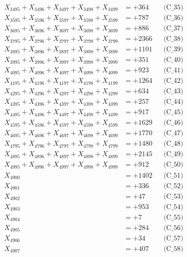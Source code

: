 \documentclass[a4paper,10pt]{article}
\begin{document}
{\begin{align}
X_{3495} + X_{3496} + X_{3497} + X_{3498} + X_{3499} &= +364 && \text{(C\_35)} \\
\allowbreak
X_{3595} + X_{3596} + X_{3597} + X_{3598} + X_{3599} &= +787 && \text{(C\_36)} \\
X_{3695} + X_{3696} + X_{3697} + X_{3698} + X_{3699} &= +886 && \text{(C\_37)} \\
X_{3795} + X_{3796} + X_{3797} + X_{3798} + X_{3799} &= +2366 && \text{(C\_38)} \\
X_{3895} + X_{3896} + X_{3897} + X_{3898} + X_{3899} &= +1101 && \text{(C\_39)} \\
X_{3995} + X_{3996} + X_{3997} + X_{3998} + X_{3999} &= +351 && \text{(C\_40)} \\
\allowbreak
X_{4095} + X_{4096} + X_{4097} + X_{4098} + X_{4099} &= +923 && \text{(C\_41)} \\
X_{4195} + X_{4196} + X_{4197} + X_{4198} + X_{4199} &= +1264 && \text{(C\_42)} \\
X_{4295} + X_{4296} + X_{4297} + X_{4298} + X_{4299} &= +634 && \text{(C\_43)} \\
X_{4395} + X_{4396} + X_{4397} + X_{4398} + X_{4399} &= +257 && \text{(C\_44)} \\
X_{4495} + X_{4496} + X_{4497} + X_{4498} + X_{4499} &= +917 && \text{(C\_45)} \\
\allowbreak
X_{4595} + X_{4596} + X_{4597} + X_{4598} + X_{4599} &= +1629 && \text{(C\_46)} \\
X_{4695} + X_{4696} + X_{4697} + X_{4698} + X_{4699} &= +1770 && \text{(C\_47)} \\
X_{4795} + X_{4796} + X_{4797} + X_{4798} + X_{4799} &= +1480 && \text{(C\_48)} \\
X_{4895} + X_{4896} + X_{4897} + X_{4898} + X_{4899} &= +2145 && \text{(C\_49)} \\
X_{4995} + X_{4996} + X_{4997} + X_{4998} + X_{4999} &= +912 && \text{(C\_50)} \\
\allowbreak
X_{4900} &= +1402 && \text{(C\_51)} \\
X_{4901} &= +336 && \text{(C\_52)} \\
X_{4902} &= +47 && \text{(C\_53)} \\
X_{4903} &= +953 && \text{(C\_54)} \\
X_{4904} &= +7 && \text{(C\_55)} \\
\allowbreak
X_{4905} &= +284 && \text{(C\_56)} \\
X_{4906} &= +34 && \text{(C\_57)} \\
X_{4907} &= +407 && \text{(C\_58)} \\

\end{align}}
\end{document}
